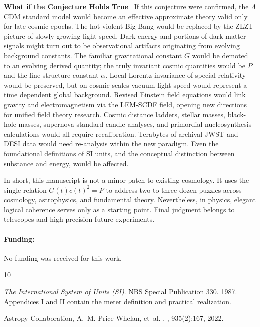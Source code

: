 \documentclass[12pt,leqno]{article}
\begin{document}
{	\bigskip
	\textbf{What if the Conjecture Holds True}\,\,\,	
	If this conjecture were confirmed, the $\Lambda$CDM standard model would become an effective approximate theory valid only for late cosmic epochs. The hot violent Big Bang would be replaced by the ZLZT picture of slowly growing light speed. Dark energy and portions of dark matter signals might turn out to be observational artifacts originating from evolving background constants. The familiar gravitational constant $G$ would be demoted to an evolving derived quantity; the truly invariant cosmic quantities would be $P$ and the fine structure constant $\alpha$. Local Lorentz invariance of special relativity would be preserved, but on cosmic scales vacuum light speed would represent a time dependent global background. Revised Einstein field equations would link gravity and electromagnetism via the LEM-SCDF field, opening new directions for unified field theory research. Cosmic distance ladders, stellar masses, black-hole masses, supernova standard candle analyses, and primordial nucleosynthesis calculations would all require recalibration. Terabytes of archival JWST and DESI data would need re-analysis within the new paradigm. Even the foundational definitions of SI units, and the conceptual distinction between substance and energy, would be affected.
	
	\bigskip
	In short, this manuscript is not a minor patch to existing cosmology. It uses the single relation $G(t)c(t)^2=P$ to address two to three dozen puzzles across cosmology, astrophysics, and fundamental theory. Nevertheless, in physics, elegant logical coherence serves only as a starting point. Final judgment belongs to telescopes and high-precision future experiments.
	

	
	\vskip 0.5in
	\paragraph{Funding:} No funding was received for this work.
	
	
	\vskip 0.5in
	
	\begin{thebibliography}{10}
		
		{\em The International System of Units (SI)}.
		\newblock NBS Special Publication 330. 1987.
		\newblock Appendices I and II contain the meter definition and practical
		realization.
		
		Astropy Collaboration, A.~M. Price-Whelan, et~al.
		.
		, 935(2):167, 2022.
		

\end{thebibliography}}
\end{document}
